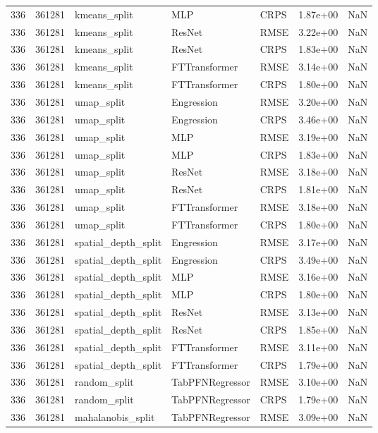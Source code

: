 \begin{tabular}{rrlllrr}
336 & 361281 & kmeans\_split & MLP & CRPS & 1.87e+00 & NaN \\
336 & 361281 & kmeans\_split & ResNet & RMSE & 3.22e+00 & NaN \\
336 & 361281 & kmeans\_split & ResNet & CRPS & 1.83e+00 & NaN \\
336 & 361281 & kmeans\_split & FTTransformer & RMSE & 3.14e+00 & NaN \\
336 & 361281 & kmeans\_split & FTTransformer & CRPS & 1.80e+00 & NaN \\
336 & 361281 & umap\_split & Engression & RMSE & 3.20e+00 & NaN \\
336 & 361281 & umap\_split & Engression & CRPS & 3.46e+00 & NaN \\
336 & 361281 & umap\_split & MLP & RMSE & 3.19e+00 & NaN \\
336 & 361281 & umap\_split & MLP & CRPS & 1.83e+00 & NaN \\
336 & 361281 & umap\_split & ResNet & RMSE & 3.18e+00 & NaN \\
336 & 361281 & umap\_split & ResNet & CRPS & 1.81e+00 & NaN \\
336 & 361281 & umap\_split & FTTransformer & RMSE & 3.18e+00 & NaN \\
336 & 361281 & umap\_split & FTTransformer & CRPS & 1.80e+00 & NaN \\
336 & 361281 & spatial\_depth\_split & Engression & RMSE & 3.17e+00 & NaN \\
336 & 361281 & spatial\_depth\_split & Engression & CRPS & 3.49e+00 & NaN \\
336 & 361281 & spatial\_depth\_split & MLP & RMSE & 3.16e+00 & NaN \\
336 & 361281 & spatial\_depth\_split & MLP & CRPS & 1.80e+00 & NaN \\
336 & 361281 & spatial\_depth\_split & ResNet & RMSE & 3.13e+00 & NaN \\
336 & 361281 & spatial\_depth\_split & ResNet & CRPS & 1.85e+00 & NaN \\
336 & 361281 & spatial\_depth\_split & FTTransformer & RMSE & 3.11e+00 & NaN \\
336 & 361281 & spatial\_depth\_split & FTTransformer & CRPS & 1.79e+00 & NaN \\
336 & 361281 & random\_split & TabPFNRegressor & RMSE & 3.10e+00 & NaN \\
336 & 361281 & random\_split & TabPFNRegressor & CRPS & 1.79e+00 & NaN \\
336 & 361281 & mahalanobis\_split & TabPFNRegressor & RMSE & 3.09e+00 & NaN \\

\end{tabular}
